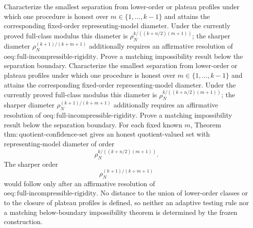Characterize the smallest separation from lower-order or plateau profiles under which one procedure is honest over \(m\in\{1,\ldots,k-1\}\) and attains the corresponding fixed-order representing-model diameter. Under the currently proved full-class modulus this diameter is \(\rho_N^{k/((k+n/2)(m+1))}\); the sharper diameter \(\rho_N^{(k+1)/(k+m+1)}\) additionally requires an affirmative resolution of \(\mathrm{oeq:full\text{-}incompressible\text{-}rigidity}\). Prove a matching impossibility result below the separation boundary.
Characterize the smallest separation from lower-order or plateau profiles under which one procedure is honest over \(m\in\{1,\ldots,k-1\}\) and attains the corresponding fixed-order representing-model diameter. Under the currently proved full-class modulus this diameter is \(\rho_N^{k/((k+n/2)(m+1))}\); the sharper diameter \(\rho_N^{(k+1)/(k+m+1)}\) additionally requires an affirmative resolution of \(\mathrm{oeq:full\text{-}incompressible\text{-}rigidity}\). Prove a matching impossibility result below the separation boundary.
For each fixed known \(m\), Theorem \(\mathrm{thm:quotient\text{-}confidence\text{-}set}\) gives an honest quotient-valued set with representing-model diameter of order
\[
\rho_N^{k/((k+n/2)(m+1))}.
\]
The sharper order
\[
\rho_N^{(k+1)/(k+m+1)}
\]
would follow only after an affirmative resolution of \(\mathrm{oeq:full\text{-}incompressible\text{-}rigidity}\). No distance to the union of lower-order classes or to the closure of plateau profiles is defined, so neither an adaptive testing rule nor a matching below-boundary impossibility theorem is determined by the frozen construction.
